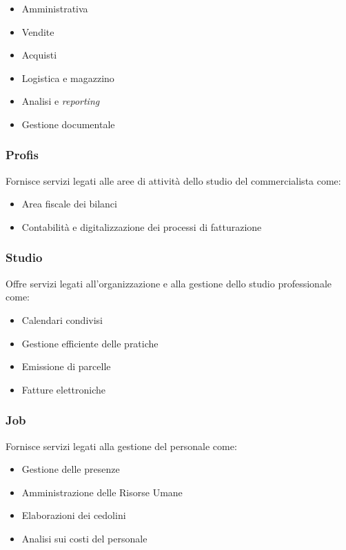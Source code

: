 \begin{itemize}
    \item Amministrativa 
    \item Vendite 
    \item Acquisti 
    \item Logistica e magazzino
    \item Analisi e \emph{reporting}
    \item Gestione documentale
\end{itemize}

\subsubsection*{Profis}
Fornisce servizi legati alle aree di attività dello studio del commercialista come: 
\begin{itemize}
    \item Area fiscale dei bilanci 
    \item Contabilità e digitalizzazione dei processi di fatturazione  
\end{itemize}

\subsubsection*{Studio}
Offre servizi legati all'organizzazione e alla gestione dello studio professionale come:
\begin{itemize}
    \item Calendari condivisi  
    \item Gestione efficiente delle pratiche 
    \item Emissione di parcelle  
    \item Fatture elettroniche 
\end{itemize}

\subsubsection*{Job}
Fornisce servizi legati alla gestione del personale come: 
\begin{itemize}
    \item Gestione delle presenze  
    \item Amministrazione delle Risorse Umane  
    \item Elaborazioni dei cedolini 
    \item Analisi sui costi del personale
\end{itemize}

